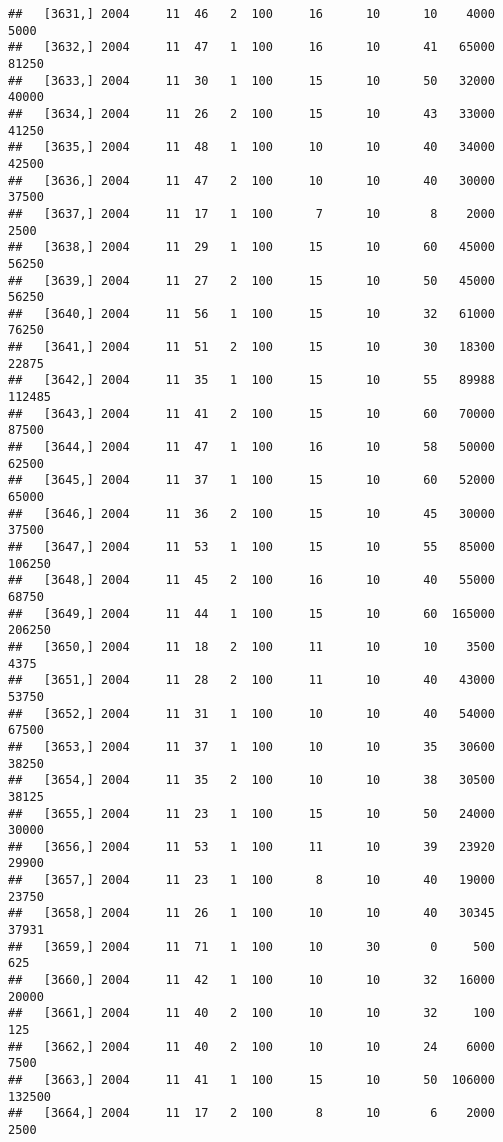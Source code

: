 \documentclass{article}\usepackage[]{graphicx}\usepackage[]{color}
\makeatletter
\newenvironment{kframe}{%
 \def\at@end@of@kframe{}%
 \ifinner\ifhmode%
  \def\at@end@of@kframe{\end{minipage}}%
  \begin{minipage}{\columnwidth}%
 \fi\fi%
 \def\FrameCommand##1{\hskip\@totalleftmargin \hskip-\fboxsep
 \colorbox{shadecolor}{##1}\hskip-\fboxsep
     \hskip-\linewidth \hskip-\@totalleftmargin \hskip\columnwidth}%
 \MakeFramed {\advance\hsize-\width
   \@totalleftmargin\z@ \linewidth\hsize
   \@setminipage}}%
 {\par\unskip\endMakeFramed%
 \at@end@of@kframe}
\newenvironment{knitrout}{}{} %
\makeatother
\begin{document}
\begin{knitrout}
\begin{kframe}
\begin{verbatim}
##   [3631,] 2004     11  46   2  100     16      10      10    4000    5000
##   [3632,] 2004     11  47   1  100     16      10      41   65000   81250
##   [3633,] 2004     11  30   1  100     15      10      50   32000   40000
##   [3634,] 2004     11  26   2  100     15      10      43   33000   41250
##   [3635,] 2004     11  48   1  100     10      10      40   34000   42500
##   [3636,] 2004     11  47   2  100     10      10      40   30000   37500
##   [3637,] 2004     11  17   1  100      7      10       8    2000    2500
##   [3638,] 2004     11  29   1  100     15      10      60   45000   56250
##   [3639,] 2004     11  27   2  100     15      10      50   45000   56250
##   [3640,] 2004     11  56   1  100     15      10      32   61000   76250
##   [3641,] 2004     11  51   2  100     15      10      30   18300   22875
##   [3642,] 2004     11  35   1  100     15      10      55   89988  112485
##   [3643,] 2004     11  41   2  100     15      10      60   70000   87500
##   [3644,] 2004     11  47   1  100     16      10      58   50000   62500
##   [3645,] 2004     11  37   1  100     15      10      60   52000   65000
##   [3646,] 2004     11  36   2  100     15      10      45   30000   37500
##   [3647,] 2004     11  53   1  100     15      10      55   85000  106250
##   [3648,] 2004     11  45   2  100     16      10      40   55000   68750
##   [3649,] 2004     11  44   1  100     15      10      60  165000  206250
##   [3650,] 2004     11  18   2  100     11      10      10    3500    4375
##   [3651,] 2004     11  28   2  100     11      10      40   43000   53750
##   [3652,] 2004     11  31   1  100     10      10      40   54000   67500
##   [3653,] 2004     11  37   1  100     10      10      35   30600   38250
##   [3654,] 2004     11  35   2  100     10      10      38   30500   38125
##   [3655,] 2004     11  23   1  100     15      10      50   24000   30000
##   [3656,] 2004     11  53   1  100     11      10      39   23920   29900
##   [3657,] 2004     11  23   1  100      8      10      40   19000   23750
##   [3658,] 2004     11  26   1  100     10      10      40   30345   37931
##   [3659,] 2004     11  71   1  100     10      30       0     500     625
##   [3660,] 2004     11  42   1  100     10      10      32   16000   20000
##   [3661,] 2004     11  40   2  100     10      10      32     100     125
##   [3662,] 2004     11  40   2  100     10      10      24    6000    7500
##   [3663,] 2004     11  41   1  100     15      10      50  106000  132500
##   [3664,] 2004     11  17   2  100      8      10       6    2000    2500

\end{verbatim}
\end{kframe}
\end{knitrout}
\end{document}
